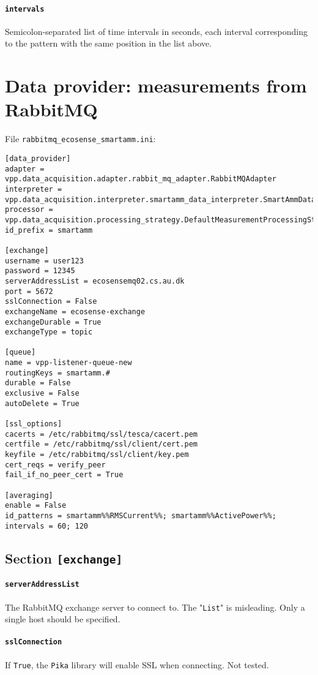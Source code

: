 {\paragraph{\texttt{intervals}}
Semicolon-separated list of time intervals in seconds, each interval corresponding to the pattern with the same position in the list above.

\newpage
\section{Data provider: measurements from RabbitMQ}
File \texttt{rabbitmq\_ecosense\_smartamm.ini}:
\begin{lstlisting}
[data_provider]
adapter = 
vpp.data_acquisition.adapter.rabbit_mq_adapter.RabbitMQAdapter
interpreter = 
vpp.data_acquisition.interpreter.smartamm_data_interpreter.SmartAmmDataInterpreter
processor = 
vpp.data_acquisition.processing_strategy.DefaultMeasurementProcessingStrategy
id_prefix = smartamm

[exchange]
username = user123
password = 12345
serverAddressList = ecosensemq02.cs.au.dk
port = 5672
sslConnection = False
exchangeName = ecosense-exchange
exchangeDurable = True
exchangeType = topic

[queue]
name = vpp-listener-queue-new
routingKeys = smartamm.#
durable = False
exclusive = False
autoDelete = True

[ssl_options]
cacerts = /etc/rabbitmq/ssl/tesca/cacert.pem
certfile = /etc/rabbitmq/ssl/client/cert.pem
keyfile = /etc/rabbitmq/ssl/client/key.pem
cert_reqs = verify_peer
fail_if_no_peer_cert = True 

[averaging]
enable = False
id_patterns = smartamm%%RMSCurrent%%; smartamm%%ActivePower%%;
intervals = 60; 120
\end{lstlisting}

\subsection{Section \texttt{[exchange]}}


\paragraph{\texttt{serverAddressList}} The RabbitMQ exchange server to connect to. The "\texttt{List}" is misleading. Only a single host should be specified.

\paragraph{\texttt{sslConnection}} If \texttt{True}, the \texttt{Pika} library will enable SSL when connecting. Not tested.

}
